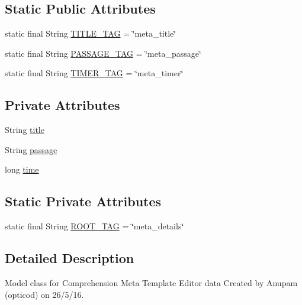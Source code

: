 \subsection*{Static Public Attributes}
\begin{DoxyCompactItemize}
\item 
static final String \hyperlink{classorg_1_1buildmlearn_1_1toolkit_1_1templates_1_1ComprehensionMetaModel_ab1fe2f4e431c321ba34b7a35d3dda4f6}{T\+I\+T\+L\+E\+\_\+\+T\+AG} = \char`\"{}meta\+\_\+title\char`\"{}
\item 
static final String \hyperlink{classorg_1_1buildmlearn_1_1toolkit_1_1templates_1_1ComprehensionMetaModel_aca9d07b053b4eec6f3f5b0a6df2b05ba}{P\+A\+S\+S\+A\+G\+E\+\_\+\+T\+AG} = \char`\"{}meta\+\_\+passage\char`\"{}
\item 
static final String \hyperlink{classorg_1_1buildmlearn_1_1toolkit_1_1templates_1_1ComprehensionMetaModel_aaf75e6d47a29319b3284628c343459a9}{T\+I\+M\+E\+R\+\_\+\+T\+AG} = \char`\"{}meta\+\_\+timer\char`\"{}
\end{DoxyCompactItemize}
\subsection*{Private Attributes}
\begin{DoxyCompactItemize}
\item 
String \hyperlink{classorg_1_1buildmlearn_1_1toolkit_1_1templates_1_1ComprehensionMetaModel_a904f81c4bb8b842a42b4dd9ff6c7af57}{title}
\item 
String \hyperlink{classorg_1_1buildmlearn_1_1toolkit_1_1templates_1_1ComprehensionMetaModel_af55829e04fda344cafd3718fe3679369}{passage}
\item 
long \hyperlink{classorg_1_1buildmlearn_1_1toolkit_1_1templates_1_1ComprehensionMetaModel_adb29204102c4f3272ae85270899e40b8}{time}
\end{DoxyCompactItemize}
\subsection*{Static Private Attributes}
\begin{DoxyCompactItemize}
\item 
static final String \hyperlink{classorg_1_1buildmlearn_1_1toolkit_1_1templates_1_1ComprehensionMetaModel_a7088331afb5b47a66d108c0af2acfa82}{R\+O\+O\+T\+\_\+\+T\+AG} = \char`\"{}meta\+\_\+details\char`\"{}
\end{DoxyCompactItemize}


\subsection{Detailed Description}
Model class for Comprehension Meta Template Editor data Created by Anupam (opticod) on 26/5/16. 

